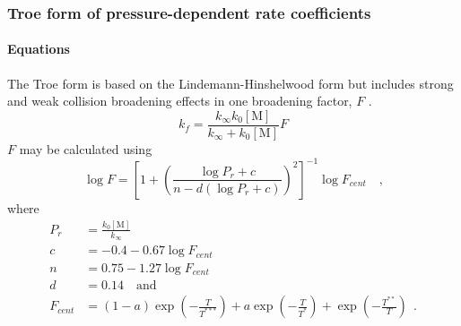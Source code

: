 \subsubsection{Troe form of pressure-dependent rate coefficients}

\paragraph{Equations}
The Troe form is based on the Lindemann-Hinshelwood form but includes strong and weak collision broadening effects in one broadening factor, $F$ \cite{gilbert_etal_1983}.
\begin{equation}
 k_f=\frac{k_\infty k_0[\text{M}]}{k_\infty + k_0[\text{M}]} F
\end{equation}
$F$ may be calculated using
\begin{equation}
\log F=
  \left[ 1+ \left( \frac{\log P_r + c}{n-d\left(\log P_r + c\right)}\right)^2 \right]^{-1} \log F_{cent}%
\quad \text{,}
\end{equation}
where
\begin{equation}
\label{eqn:troe-params}
 \begin{aligned}
  P_r &= \frac{k_0[\text{M}]}{k_\infty} \\
  c &= -0.4-0.67\log F_{cent} \\
  n &= 0.75-1.27\log F_{cent} \\
  d &= 0.14 \quad \text{and}\\
  F_{cent} &= \left( 1-a \right) \exp \left( -\frac{T}{T^{***}} \right) + a \exp \left( -\frac{T}{T^*} \right) + \exp \left( -\frac{T^{**}}{T} \right)~~\text{.}
 \end{aligned}
\end{equation}

